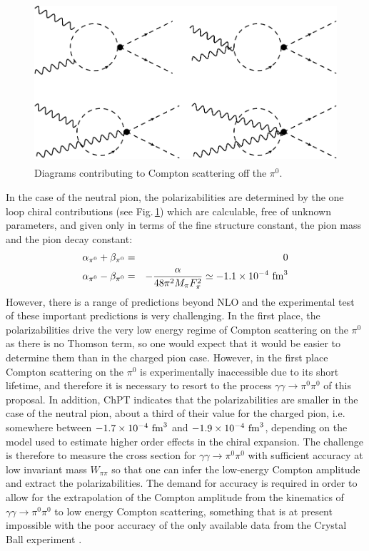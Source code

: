 \begin{figure}[h]
\begin{center}
\includegraphics[height=6cm,angle=0]{figures/DiagramsChPT.pdf}
\end{center}
\caption{Diagrams contributing to Compton scattering off the $\pi^0$.
\label{fig:digrams}}
\end{figure}


In the case of the neutral pion, the polarizabilities are determined
by the one loop chiral contributions (see Fig.\,\ref{fig:digrams})
which are calculable, free of unknown parameters, and given only in
terms of the fine structure constant, the pion mass and the pion decay
constant:
\begin{eqnarray}
\alpha_{\pi^0}+\beta_{\pi^0}&=&0\nonumber\\
\alpha_{\pi^0}-\beta_{\pi^0}&=&-\frac{\alpha}{48 \pi^2 M_\pi F_\pi^2}\simeq -1.1\times 10^{-4}~{\rm fm}^3
\end{eqnarray}
However, there is a range of predictions beyond
NLO and the experimental test of these important predictions is very
challenging. In the first place, the polarizabilities drive the very
low energy regime of Compton scattering on the $\pi^0$ as there is no
Thomson term, so one would expect that it would be easier to determine
them than in the charged pion case.  However, in the first place
Compton scattering on the $\pi^0$ is experimentally inaccessible due
to its short lifetime, and therefore it is necessary to resort to the
process $\gamma\gamma\to \pi^0\pi^0$ of this proposal. In addition, ChPT
indicates that the
polarizabilities are smaller in the case of the neutral pion, about a
third of their value for the charged pion, i.e. somewhere between
$-1.7\times 10^{-4}~{\rm fm}^3$ and $-1.9\times 10^{-4}~{\rm fm}^3$,
depending on the model used to estimate higher order effects in the chiral
expansion. The challenge is therefore to measure the
cross section for $\gamma\gamma \to \pi^0\pi^0$ with sufficient
accuracy at low invariant mass $W_{\pi\pi}$ so that one can infer the
low-energy Compton amplitude and extract the polarizabilities. The demand for
accuracy is required in order to allow for the extrapolation of the Compton
amplitude from the kinematics of $\gamma\gamma \to \pi^0\pi^0$ to   low energy
Compton scattering, something that is at present impossible with the poor
accuracy of the only available data from the Crystal Ball experiment \cite{}.
 


